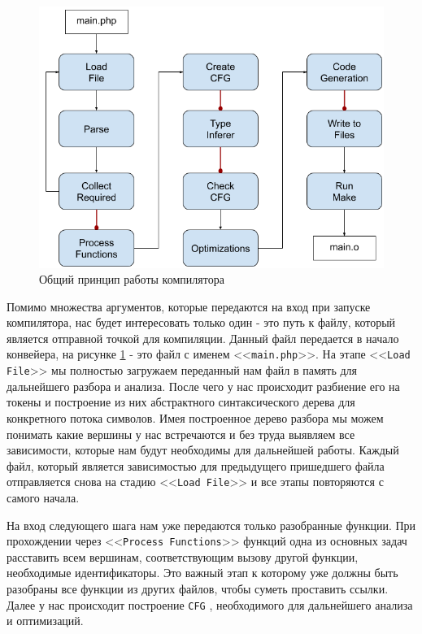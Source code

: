 \begin{figure}[H]
    \caption{Общий принцип работы компилятора}
    \label{fig:compiler_arch}
    \centering
    \includegraphics[width=\linewidth]{images/compiler_arch}
\end{figure}

Помимо множества аргументов, которые передаются на вход при запуске компилятора, нас будет интересовать только один - это путь к файлу, который является отправной точкой для компиляции.
Данный файл передается в начало конвейера, на рисунке \ref{fig:compiler_arch} - это файл с именем <<\verb|main.php|>>.
На этапе <<\verb|Load File|>> мы полностью загружаем переданный нам файл в память для дальнейшего разбора и анализа.
После чего у нас происходит разбиение его на токены и построение из них абстрактного синтаксического дерева для конкретного потока символов.
Имея построенное дерево разбора мы можем понимать какие вершины у нас встречаются и без труда выявляем все зависимости, которые нам будут необходимы для дальнейшей работы.
Каждый файл, который является зависимостью для предыдущего пришедшего файла отправляется снова на стадию <<\verb|Load File|>> и все этапы повторяются с самого начала.

На вход следующего шага нам уже передаются только разобранные функции.
При прохождении через <<\verb|Process Functions|>>  функций одна из основных задач расставить всем вершинам, соответствующим вызову другой функции, необходимые идентификаторы.
Это важный этап к которому уже должны быть разобраны все функции из других файлов, чтобы суметь проставить ссылки. Далее у нас происходит построение \verb|CFG| \cite{CFG}, необходимого для дальнейшего анализа и оптимизаций.

